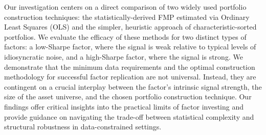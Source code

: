 \documentclass[]{article}
\begin{document}
Our investigation centers on a direct comparison of two widely used portfolio construction techniques: the statistically-derived FMP estimated via Ordinary Least Squares (OLS) and the simpler, heuristic approach of characteristic-sorted portfolios. We evaluate the efficacy of these methods for two distinct types of factors: a low-Sharpe factor, where the signal is weak relative to typical levels of idiosyncratic noise, and a high-Sharpe factor, where the signal is strong. We demonstrate that the minimum data requirements and the optimal construction methodology for successful factor replication are not universal. Instead, they are contingent on a crucial interplay between the factor's intrinsic signal strength, the size of the asset universe, and the chosen portfolio construction technique. Our findings offer critical insights into the practical limits of factor investing and provide guidance on navigating the trade-off between statistical complexity and structural robustness in data-constrained settings.
\end{document}
